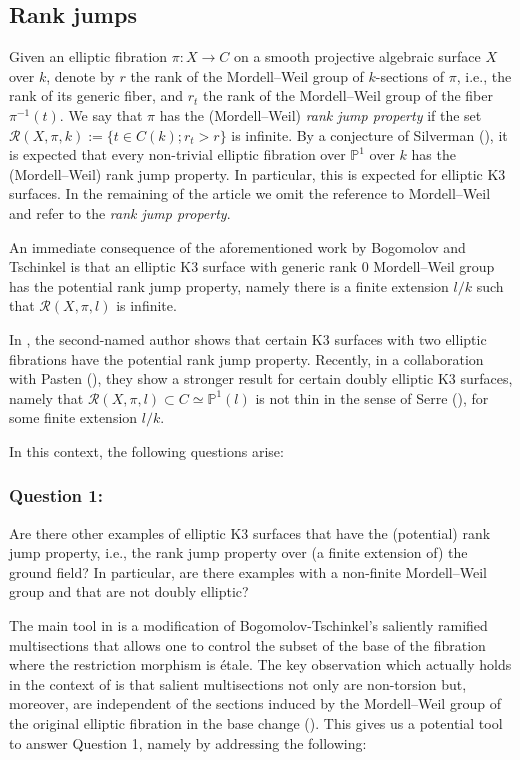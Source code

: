 \documentclass{amsart}
\theoremstyle{definition}
\numberwithin{equation}{section}
\begin{document}
\subsection*{Rank jumps} Given an elliptic fibration $\pi: X \rightarrow C$ on a smooth projective algebraic surface $X$ over $k$, denote by $r$ the rank of the Mordell--Weil group of  $k$-sections of $\pi$, i.e., the rank of its generic fiber, and $r_t$ the rank of the Mordell--Weil group of the fiber $\pi^{-1}(t)$. We say that $\pi$ has the (Mordell--Weil) \textit{rank jump property} if the set $\mathcal{R}(X, \pi, k):=\{t \in C(k); r_t > r \}$ is infinite. By a conjecture of Silverman (\cite[p. 556]{Silverman85}), it is expected that every non-trivial elliptic fibration over $\mathbb{P}^1$ over $k$ has the (Mordell--Weil) rank jump property. In particular, this is expected for elliptic K3 surfaces. In the remaining of the article we omit the reference to Mordell--Weil and refer to the \textit{rank jump property}.

An immediate consequence of the aforementioned work by Bogomolov and Tschinkel is that an elliptic K3 surface with generic rank 0 Mordell--Weil group has the potential rank jump property, namely there is a finite extension $l/k$ such that $\mathcal{R}(X,\pi, l)$ is infinite. 

In \cite{SalgadoK3}, the second-named author shows that certain K3 surfaces with two elliptic fibrations have the potential rank jump property. Recently, in a collaboration with Pasten (\cite{PastenSalgado}), they show a stronger result for certain doubly elliptic K3 surfaces, namely that $\mathcal{R}(X,\pi, l) \subset C \simeq \mathbb{P}^1(l)$ is not thin in the sense of Serre (\cite[Section 9.1]{Serre}), for some finite extension $l/k$. 

In this context, the following questions arise:

\subsubsection*{Question 1:} Are there other examples of elliptic K3 surfaces that have the (potential) rank jump property, i.e., the rank jump property over (a finite extension of) the ground field? In particular, are there examples with a non-finite Mordell--Weil group and that are not doubly elliptic?
\indent\par
\indent\par
The main tool in \cite{PastenSalgado} is a modification of Bogomolov-Tschinkel's saliently ramified multisections that allows one to control the subset of the base of the fibration where the restriction morphism is \'etale. The key observation which actually holds in the context of \cite{BT} is that salient multisections not only are non-torsion but, moreover, are independent of the sections induced by the Mordell--Weil group of the original elliptic fibration in the base change (\cite[Lemma 3.3]{PastenSalgado}). 
This gives us a potential tool to answer Question 1, namely by addressing the following:
\end{document}

